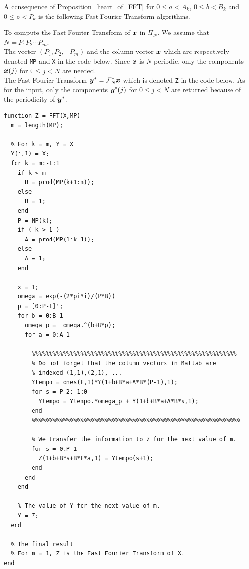 A consequence of Proposition~\ref{heart_of_FFT} for $0\leq a <A_k$,
$0\leq b < B_k$ and $0\leq p < P_k$ is the following
Fast Fourier Transform algorithms.

\begin{code}
To compute the Fast Fourier Transform of $\bm{x}$ in $\Pi_N$.  We
assume that $N = P_1 P_2 \cdots P_m$.\\
 The vector $(P_1,P_2, \cdots P_m)$ and the column vector
$\bm{x}$ which are respectively denoted \verb!MP! and \verb!X! in the
code below.  Since $\bm{x}$ is $N$-periodic, only the
components $\bm{x}(j)$ for $0 \leq j < N$ are needed.\\
 The Fast Fourier Transform
$\displaystyle \bm{y}^\ast= \mathcal{F}^\ast_N \bm{x}$ which is
denoted \verb!Z! in the code below.  As for the input, only the
components $\displaystyle \bm{y}^\ast(j)$ for $0 \leq j < N$ are returned
because of the periodicity of $\displaystyle \bm{y}^\ast$.
\small
\begin{verbatim}
function Z = FFT(X,MP)
  m = length(MP);

  % For k = m, Y = X
  Y(:,1) = X;
  for k = m:-1:1
    if k < m
      B = prod(MP(k+1:m));
    else 
      B = 1;
    end
    P = MP(k);
    if ( k > 1 )
      A = prod(MP(1:k-1));
    else
      A = 1;
    end

    x = 1;
    omega = exp(-(2*pi*i)/(P*B))
    p = [0:P-1]';
    for b = 0:B-1
      omega_p =  omega.^(b+B*p);
      for a = 0:A-1

        %%%%%%%%%%%%%%%%%%%%%%%%%%%%%%%%%%%%%%%%%%%%%%%%%%%%%%%%%%%
        % Do not forget that the column vectors in Matlab are
        % indexed (1,1),(2,1), ...
        Ytempo = ones(P,1)*Y(1+b+B*a+A*B*(P-1),1);
        for s = P-2:-1:0
          Ytempo = Ytempo.*omega_p + Y(1+b+B*a+A*B*s,1);
        end
        %%%%%%%%%%%%%%%%%%%%%%%%%%%%%%%%%%%%%%%%%%%%%%%%%%%%%%%%%%%%

        % We transfer the information to Z for the next value of m.
        for s = 0:P-1
          Z(1+b+B*s+B*P*a,1) = Ytempo(s+1);
        end
      end
    end

    % The value of Y for the next value of m.
    Y = Z;
  end

  % The final result
  % For m = 1, Z is the Fast Fourier Transform of X. 
end
\end{verbatim}
\end{code}


